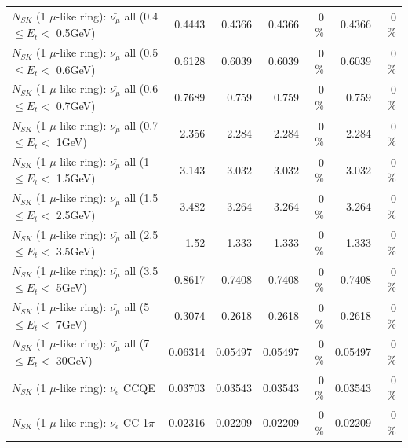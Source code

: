 \begin{table}
\begin{tabular}{| l | r | r | r  r | r  r |}
 $N_{SK}$ (1 $\mu$-like ring): $\bar{\nu_{\mu}}$ all (0.4 $\leq E_{t} <$ 0.5GeV) &          0.4443 &          0.4366 &          0.4366 &        0 \%  &          0.4366 &        0 \%  \\ 
 $N_{SK}$ (1 $\mu$-like ring): $\bar{\nu_{\mu}}$ all (0.5 $\leq E_{t} <$ 0.6GeV) &          0.6128 &          0.6039 &          0.6039 &        0 \%  &          0.6039 &        0 \%  \\ 
 $N_{SK}$ (1 $\mu$-like ring): $\bar{\nu_{\mu}}$ all (0.6 $\leq E_{t} <$ 0.7GeV) &          0.7689 &           0.759 &           0.759 &        0 \%  &           0.759 &        0 \%  \\ 
   $N_{SK}$ (1 $\mu$-like ring): $\bar{\nu_{\mu}}$ all (0.7 $\leq E_{t} <$ 1GeV) &           2.356 &           2.284 &           2.284 &        0 \%  &           2.284 &        0 \%  \\ 
   $N_{SK}$ (1 $\mu$-like ring): $\bar{\nu_{\mu}}$ all (1 $\leq E_{t} <$ 1.5GeV) &           3.143 &           3.032 &           3.032 &        0 \%  &           3.032 &        0 \%  \\ 
 $N_{SK}$ (1 $\mu$-like ring): $\bar{\nu_{\mu}}$ all (1.5 $\leq E_{t} <$ 2.5GeV) &           3.482 &           3.264 &           3.264 &        0 \%  &           3.264 &        0 \%  \\ 
 $N_{SK}$ (1 $\mu$-like ring): $\bar{\nu_{\mu}}$ all (2.5 $\leq E_{t} <$ 3.5GeV) &            1.52 &           1.333 &           1.333 &        0 \%  &           1.333 &        0 \%  \\ 
   $N_{SK}$ (1 $\mu$-like ring): $\bar{\nu_{\mu}}$ all (3.5 $\leq E_{t} <$ 5GeV) &          0.8617 &          0.7408 &          0.7408 &        0 \%  &          0.7408 &        0 \%  \\ 
     $N_{SK}$ (1 $\mu$-like ring): $\bar{\nu_{\mu}}$ all (5 $\leq E_{t} <$ 7GeV) &          0.3074 &          0.2618 &          0.2618 &        0 \%  &          0.2618 &        0 \%  \\ 
    $N_{SK}$ (1 $\mu$-like ring): $\bar{\nu_{\mu}}$ all (7 $\leq E_{t} <$ 30GeV) &         0.06314 &         0.05497 &         0.05497 &        0 \%  &         0.05497 &        0 \%  \\ 
\hline
\hline
\hline
                                      $N_{SK}$ (1 $\mu$-like ring): $\nu_e$ CCQE &         0.03703 &         0.03543 &         0.03543 &        0 \%  &         0.03543 &        0 \%  \\ 
                                 $N_{SK}$ (1 $\mu$-like ring): $\nu_e$ CC 1$\pi$ &         0.02316 &         0.02209 &         0.02209 &        0 \%  &         0.02209 &        0 \%  \\ 

\end{tabular}
\end{table}
